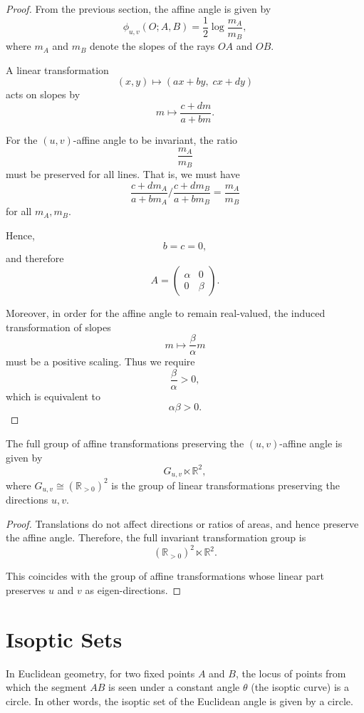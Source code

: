 \documentclass[12pt]{article}
\begin{document}
\begin{proof}
From the previous section, the affine angle is given by
\[
\phi_{u,v}(O;A,B)
=
\frac{1}{2}\log\frac{m_A}{m_B},
\]
where $m_A$ and $m_B$ denote the slopes of the rays $OA$ and $OB$.

A linear transformation
\[
(x,y)\mapsto (ax+by,\;cx+dy)
\]
acts on slopes by
\[
m\longmapsto \frac{c+dm}{a+bm}.
\]

For the $(u,v)$-affine angle to be invariant,
the ratio
\[
\frac{m_A}{m_B}
\]
must be preserved for all lines.
That is, we must have
\[
\frac{c+dm_A}{a+bm_A}\Big/\frac{c+dm_B}{a+bm_B}
=
\frac{m_A}{m_B}
\]
for all $m_A,m_B$.

Hence,
\[
b=c=0,
\]
and therefore
\[
A=
\begin{pmatrix}
\alpha & 0\\
0 & \beta
\end{pmatrix}.
\]

Moreover, in order for the affine angle to remain real-valued,
the induced transformation of slopes
\[
m\mapsto \frac{\beta}{\alpha}m
\]
must be a positive scaling.
Thus we require
\[
\frac{\beta}{\alpha}>0,
\]
which is equivalent to
\[
\alpha\beta>0.
\]
\end{proof}


\begin{proposition}
The full group of affine transformations preserving
the $(u,v)$-affine angle is given by
\[
G_{u,v}\ltimes\mathbb{R}^2,
\]
where $G_{u,v}\cong(\mathbb{R}_{>0})^2$
is the group of linear transformations preserving
the directions $u,v$.
\end{proposition}

\begin{proof}
Translations do not affect directions or ratios of areas,
and hence preserve the affine angle.
Therefore, the full invariant transformation group is
\[
(\mathbb{R}_{>0})^2\ltimes\mathbb{R}^2.
\]

This coincides with the group of affine transformations
whose linear part preserves $u$ and $v$ as eigen-directions.
\end{proof}


\section{Isoptic Sets}

In Euclidean geometry, for two fixed points $A$ and $B$, 
the locus of points from which the segment $AB$ is seen under a constant angle $\theta$ 
(the isoptic curve) is a circle. 
In other words, the isoptic set of the Euclidean angle is given by a circle.
\end{document}

